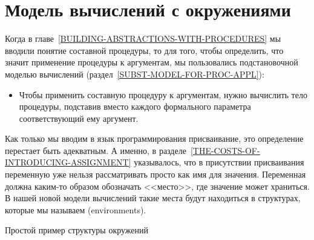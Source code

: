 \section{Модель вычислений с окружениями}
\label{THE-ENVIRONMENT-MODEL-OF-EVALUATION}


Когда в главе~\ref{BUILDING-ABSTRACTIONS-WITH-PROCEDURES} мы вводили
понятие составной процедуры, то для того, чтобы определить, что значит
применение процедуры к аргументам, мы пользовались
подстановочной
моделью вычислений (раздел~\ref{SUBST-MODEL-FOR-PROC-APPL}):

\begin{itemize}


\item
Чтобы применить составную процедуру к
аргументам, нужно вычислить тело процедуры, подставив вместо каждого
формального параметра соответствующий ему аргумент.
\end{itemize}

Как только мы вводим в язык программирования
присваивание, это определение перестает быть адекватным.  А именно, в
разделе~\ref{THE-COSTS-OF-INTRODUCING-ASSIGNMENT}
указывалось, что в присутствии присваивания переменную уже нельзя
рассматривать просто как имя для значения.  Переменная должна каким-то
образом обозначать <<место>>, где значение может храниться.  В
нашей новой модели вычислений такие места будут находиться в
структурах, которые мы называем
 (environments).


\begin{cntrfig}

\caption{Простой пример структуры окружений}
\label{P3.1}
\end{cntrfig}

